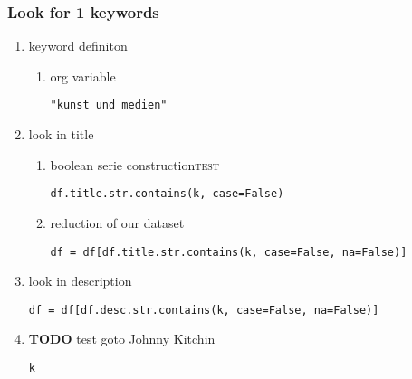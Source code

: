 \documentclass[11pt]{article}
\begin{document}
\subsubsection{Look for 1 keywords}
\label{sec:orge3e85e9}
\begin{enumerate}
\item keyword definiton
\label{sec:org4a257f4}
\begin{enumerate}
\item org variable
\label{sec:orge0d20f4}
\begin{verbatim}
"kunst und medien"
\end{verbatim}
\end{enumerate}

\item look in title
\label{sec:org3064c22}
\begin{enumerate}
\item boolean serie construction\hfill{}\textsc{test}
\label{sec:org9c2d789}
\begin{verbatim}
df.title.str.contains(k, case=False)
\end{verbatim}

\item reduction of our dataset
\label{sec:org3df851a}
\begin{verbatim}
df = df[df.title.str.contains(k, case=False, na=False)]
\end{verbatim}
\end{enumerate}

\item look in description
\label{sec:org1f097d8}
\begin{verbatim}
df = df[df.desc.str.contains(k, case=False, na=False)]
\end{verbatim}

\item {\bfseries\sffamily TODO} test
\label{sec:orgced4613}
goto Johnny Kitchin
\begin{verbatim}
k
\end{verbatim}
\end{enumerate}
\end{document}
